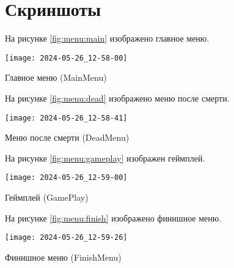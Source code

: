 \section{Скриншоты}

На рисунке \ref{fig:menu:main} изображено главное меню.                                                                            
\begin{image}
	\texttt{[image: 2024-05-26\_12-58-00]}
	\caption{Главное меню (MainMenu)}
	\label{fig:menu:main}
\end{image}

На рисунке \ref{fig:menu:dead} изображено меню после смерти.                                                                            
\begin{image}
	\texttt{[image: 2024-05-26\_12-58-41]}
	\caption{Меню после смерти (DeadMenu)}
	\label{fig:menu:dead}
\end{image}

На рисунке \ref{fig:menu:gameplay} изображен геймплей.                                                                            
\begin{image}
	\texttt{[image: 2024-05-26\_12-59-00]}
	\caption{Геймплей (GamePlay)}
	\label{fig:menu:gameplay}
\end{image}

На рисунке \ref{fig:menu:finish} изображено финишное меню.                                                                            
\begin{image}
	\texttt{[image: 2024-05-26\_12-59-26]}
	\caption{Финишное меню (FinishMenu)}
	\label{fig:menu:finish}
\end{image}


